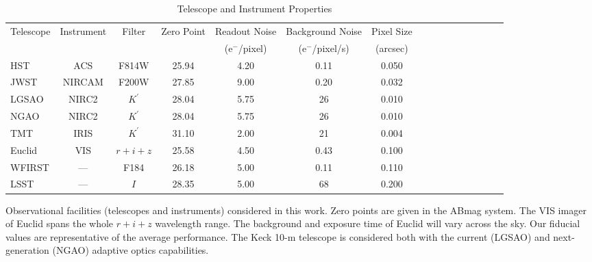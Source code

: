 \documentclass[a4paper,11pt]{article}
\begin{document}



\clearpage
\begin{table}\footnotesize
\begin{center}
\caption{Telescope and Instrument Properties}
\begin{tabular}{lccccccccccccccc|}
\hline \hline
Telescope & Instrument & Filter & Zero Point & Readout Noise & Background Noise & Pixel Size \\
 & & & & (e$^-$/pixel) & (e$^-$/pixel/s) & (arcsec) \\
\hline
  HST    & ACS    &   F814W     &  25.94  & 4.20   &    0.11    &     0.050    \\
  JWST   & NIRCAM &   F200W     &  27.85  & 9.00   &    0.20    &     0.032  \\
  LGSAO  & NIRC2  &   $K^\prime$&  28.04  & 5.75   &      26    &     0.010      \\
  NGAO   & NIRC2  &   $K^\prime$&  28.04  & 5.75   &      26    &     0.010     \\
  TMT    & IRIS   &   $K^\prime$&  31.10  & 2.00   &      21    &     0.004  \\
  Euclid & VIS    &   $r+i+z$   &  25.58  & 4.50   &    0.43    &     0.100   \\
  WFIRST & ---    &   F184      &  26.18  & 5.00   &    0.11    &     0.110   \\
  LSST   & ---    &   $I$       &  28.35  & 5.00   &      68    &     0.200  \\
\hline
\hline
\end{tabular}
\begin{tablenotes}
\item
Observational facilities (telescopes and instruments) considered in this work.
 Zero points are given in the ABmag system. The VIS imager of Euclid spans the whole $r+i+z$ wavelength range. The background and exposure time of Euclid will vary across the sky. Our fiducial values are representative of the average performance. The Keck 10-m telescope is considered both with the current (LGSAO) and next-generation (NGAO) adaptive optics capabilities.\\
\end{tablenotes}
\label{tab:telescopes parameters}
\end{center}
\end{table}
\end{document}

